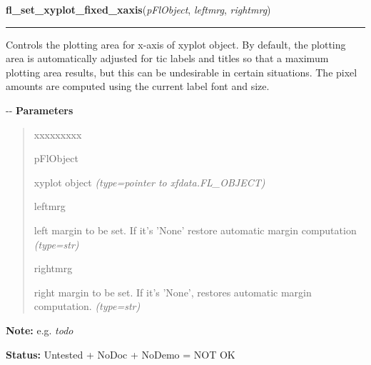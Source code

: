     \label{xformslib:flxyplot:fl_set_xyplot_fixed_xaxis}

    \vspace{0.5ex}

\hspace{.8\funcindent}\begin{boxedminipage}{\funcwidth}

    \raggedright \textbf{fl\_set\_xyplot\_fixed\_xaxis}(\textit{pFlObject}, \textit{leftmrg}, \textit{rightmrg})

    \vspace{-1.5ex}

    \rule{\textwidth}{0.5\fboxrule}
\setlength{\parskip}{2ex}

Controls the plotting area for x-axis of xyplot object. By default,
the plotting area is automatically adjusted for tic labels and titles so
that a maximum plotting area results, but this can be undesirable in
certain situations. The pixel amounts are computed using the current
label font and size.

-{}-
\setlength{\parskip}{1ex}
      \textbf{Parameters}
      \vspace{-1ex}

      \begin{quote}
        \begin{Ventry}{xxxxxxxxx}

          \item[pFlObject]


xyplot object
            {\it (type=pointer to xfdata.FL\_OBJECT)}

          \item[leftmrg]


left margin to be set. If it's 'None' restore automatic margin
computation
            {\it (type=str)}

          \item[rightmrg]


right margin to be set. If it's 'None', restores automatic margin
computation.
            {\it (type=str)}

        \end{Ventry}

      \end{quote}

\textbf{Note:} 
e.g. \emph{todo}


\textbf{Status:} 
Untested + NoDoc + NoDemo = NOT OK


    \end{boxedminipage}

